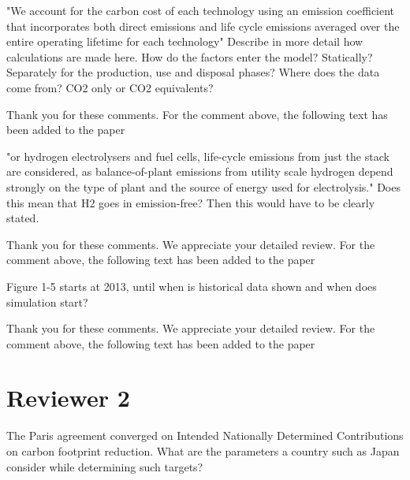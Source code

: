 \documentclass[answers,11pt]{exam}
\begin{document}
\begin{questions}
        
         \question "We account for the carbon cost of each technology using an emission coefficient that incorporates both direct emissions and life cycle emissions averaged over the entire operating lifetime for each technology"	
         Describe in more detail how calculations are made here. How do the factors enter the model? Statically? Separately for the production, use and disposal phases? Where does the data come from? CO2 only or CO2 equivalents? 
        
        \begin{solution}
                Thank you for these comments.  For the comment above, the following text has been added to the paper
        \end{solution}
        

        
         \question "or hydrogen electrolysers and fuel cells, life-cycle emissions from just the stack are considered, as balance-of-plant emissions from utility scale hydrogen depend strongly on the type of plant and the source of energy used for electrolysis."
Does this mean that H2 goes in emission-free? Then this would have to be clearly stated.
        \begin{solution}
                Thank you for these comments. We appreciate your detailed review. For the comment above, the following text has been added to the paper
        \end{solution}      
        
          
         \question Figure 1-5 starts at 2013, until when is historical data shown and when does simulation start?
        \begin{solution}
                Thank you for these comments. We appreciate your detailed review. For the comment above, the following text has been added to the paper
        \end{solution}      
              
        
        \section*{Reviewer 2}

        \question The Paris agreement converged on Intended Nationally Determined Contributions on carbon footprint reduction. What are the parameters a country such as Japan consider while determining such targets?
        

\end{questions}
\end{document}
